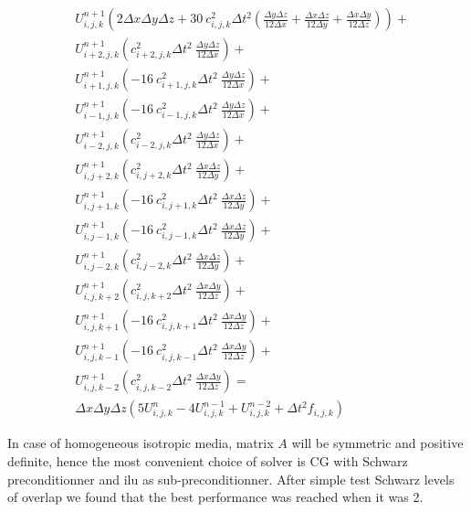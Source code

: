 \documentclass[12pt,a4paper]{report}
\begin{document}
\begin{equation}
\begin{aligned}
& U^{n+1}_{i,j,k} \left(2 \Delta x \Delta y \Delta z + 30\ c^2_{i,j,k} \Delta t^2 \left( \frac{\Delta y \Delta z}{12 \Delta x} + \frac{\Delta x \Delta z}{12 \Delta y}+ \frac{\Delta x \Delta y}{12 \Delta z}\right)\right) + \\
& U^{n+1}_{i+2,j,k}  \left(c^2_{i+2,j,k} \Delta t^2\ \frac{\Delta y \Delta z}{12 \Delta x}\right) + \\
& U^{n+1}_{i+1,j,k}  \left( -16\ c^2_{i+1,j,k} \Delta t^2\ \frac{\Delta y \Delta z}{12 \Delta x}\right) + \\
& U^{n+1}_{i-1,j,k}  \left( -16\ c^2_{i-1,j,k} \Delta t^2\ \frac{\Delta y \Delta z}{12 \Delta x}\right) + \\
& U^{n+1}_{i-2,j,k}  \left(c^2_{i-2,j,k} \Delta t^2\ \frac{\Delta y \Delta z}{12 \Delta x}\right) + \\
& U^{n+1}_{i,j+2,k}  \left(c^2_{i,j+2,k} \Delta t^2\ \frac{\Delta x \Delta z}{12 \Delta y}\right) + \\
& U^{n+1}_{i,j+1,k}  \left( -16\ c^2_{i,j+1,k} \Delta t^2\ \frac{\Delta x \Delta z}{12 \Delta y}\right) + \\
& U^{n+1}_{i,j-1,k}  \left( -16\ c^2_{i,j-1,k} \Delta t^2\ \frac{\Delta x \Delta z}{12 \Delta y}\right) + \\
& U^{n+1}_{i,j-2,k}  \left(c^2_{i,j-2,k} \Delta t^2\ \frac{\Delta x \Delta z}{12 \Delta y}\right) + \\
& U^{n+1}_{i,j,k+2}  \left(c^2_{i,j,k+2} \Delta t^2\ \frac{\Delta x \Delta y}{12 \Delta z}\right) + \\
& U^{n+1}_{i,j,k+1}  \left( -16\ c^2_{i,j,k+1} \Delta t^2\ \frac{\Delta x \Delta y}{12 \Delta z}\right) + \\
& U^{n+1}_{i,j,k-1}  \left( -16\ c^2_{i,j,k-1} \Delta t^2\ \frac{\Delta x \Delta y}{12 \Delta z}\right) + \\
& U^{n+1}_{i,j,k-2}  \left(c^2_{i,j,k-2} \Delta t^2\ \frac{\Delta x \Delta y}{12 \Delta z}\right) = \\
& \Delta x \Delta y \Delta z \left( 5 U^{n}_{i,j,k} - 4 U^{n-1}_{i,j,k} + U^{n-2}_{i,j,k} + \Delta t^2 f_{i,j,k} \right)
\end{aligned}
\end{equation}

In case of homogeneous isotropic media, matrix $A$ will be symmetric and positive definite, hence the most convenient choice of solver is CG with Schwarz preconditionner and ilu as sub-preconditionner. After simple test Schwarz levels of overlap we found that the best performance was reached when it was 2.
\end{document}
